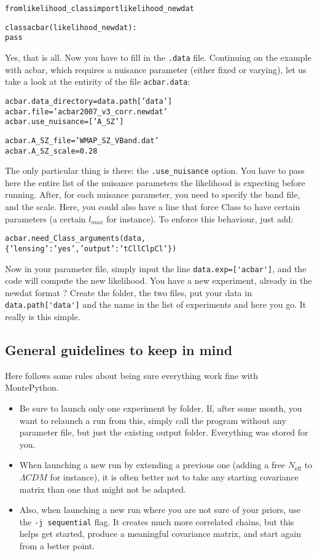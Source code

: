 \documentclass[10pt]{article}
\begin{document}
  \begin{alltt}
  from likelihood_class import likelihood_newdat

  class acbar(likelihood_newdat):
    pass
  \end{alltt}

  Yes, that is all. Now you have to fill in the \verb?.data? file. Continuing
  on the example with acbar, which requires a nuisance parameter (either fixed
  or varying), let us take a look at the entirity of the file
  \verb?acbar.data?:
  
  \begin{alltt}
    acbar.data_directory = data.path['data']
    acbar.file           = 'acbar2007_v3_corr.newdat'
    acbar.use_nuisance   = ['A_SZ']

    acbar.A_SZ_file      = 'WMAP_SZ_VBand.dat'
    acbar.A_SZ_scale     = 0.28
  \end{alltt}

  The only particular thing is there: the \verb?.use_nuisance? option. You have
  to pass here the entire list of the nuisance parameters the likelihood is
  expecting before running. After, for each nuisance parameter, you need to
  specify the band file, and the scale. Here, you could also have a line that
  force Class to have certain parameters (a certain $l_{max}$ for instance). To enforce this behaviour, just add:
  \begin{alltt}
    acbar.need_Class_arguments(data,\{'lensing':'yes', 'output':'tCl lCl pCl'\})
  \end{alltt}

  Now in your parameter file, simply input the line \verb?data.exp=['acbar']?,
  and the code will compute the new likelihood. You have a new experiment,
  already in the newdat format ? Create the folder, the two files, put your
  data in \verb?data.path['data']? and the name in the list of experiments and
  here you go. It really is this simple.

  \subsection{General guidelines to keep in mind}

  Here follows some rules about being sure everything work fine with MontePython.
\begin{itemize}
  \item Be sure to launch only one experiment by folder. If, after some month,
    you want to relaunch a run from this, simply call the program without any
    parameter file, but just the existing output folder. Everything was stored for you.
  \item When launching a new run by extending a previous one (adding a free
    $N_{\textrm{eff}}$ to $\Lambda CDM$ for instance), it is often better not to
    take any starting covariance matrix than one that might not be adapted.
  \item Also, when launching a new run where you are not sure of your priors,
    use the \verb?-j sequential? flag. It creates much more correlated chains,
    but this helps get started, produce a meaningful covariance matrix, and
    start again from a better point.
\end{itemize}
\newpage
\end{document}
